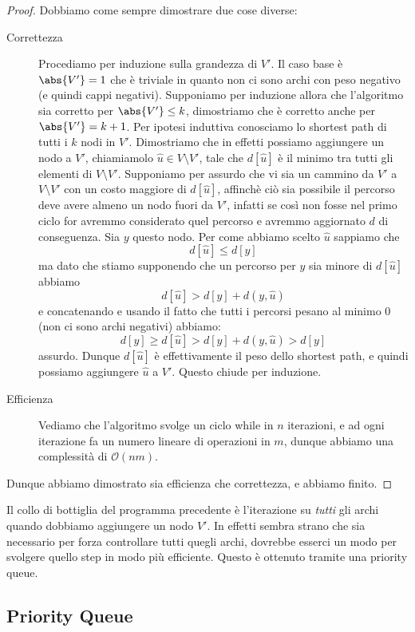 \documentclass[11pt]{scrartcl}
\newcommand{\bigo}{\mathcal{O}}
\begin{document}
	\begin{proof}
		Dobbiamo come sempre dimostrare due cose diverse:
		\begin{description}
			\item[Correttezza] Procediamo per induzione sulla grandezza di $V'$. Il caso base è $\abs{V'}=1$ che è triviale in quanto non ci sono archi con peso negativo (e quindi cappi negativi). Supponiamo per induzione allora che l'algoritmo sia corretto per $\abs{V'}\le k$, dimostriamo che è corretto anche per $\abs{V'}=k+1$. Per ipotesi induttiva conosciamo lo shortest path di tutti i $k$ nodi in $V'$. Dimostriamo che in effetti possiamo aggiungere un nodo a $V'$, chiamiamolo $\hat{u}\in V\setminus V'$, tale che $d[\hat{u}]$ è il minimo tra tutti gli elementi di $V\setminus V'$. Supponiamo per assurdo che vi sia un cammino da $V'$ a $V\setminus V'$ con un costo maggiore di $d[\hat{u}]$, affinchè ciò sia possibile il percorso deve avere almeno un nodo fuori da $V'$, infatti se così non fosse nel primo ciclo for avremmo considerato quel percorso e avremmo aggiornato $d$ di conseguenza. Sia $y$ questo nodo. Per come abbiamo scelto $\hat{u}$ sappiamo che
			$$d[\hat{u}]\le d[y]$$
			ma dato che stiamo supponendo che un percorso per $y$ sia minore di $d[\hat{u}]$ abbiamo
			$$d[\hat{u}]>d[y]+d(y,\hat{u})$$
			e concatenando e usando il fatto che tutti i percorsi pesano al minimo $0$ (non ci sono archi negativi) abbiamo:
			$$d[y]\ge d[\hat{u}] > d[y]+d(y,\hat{u})>d[y]$$
			assurdo. Dunque $d[\hat{u}]$ è effettivamente il peso dello shortest path, e quindi possiamo aggiungere $\hat{u}$ a $V'$. Questo chiude per induzione.
			\item[Efficienza] Vediamo che l'algoritmo svolge un ciclo while in $n$ iterazioni, e ad ogni iterazione fa un numero lineare di operazioni in $m$, dunque abbiamo una complessità di $\bigo(nm)$.
		\end{description}
		Dunque abbiamo dimostrato sia efficienza che correttezza, e abbiamo finito.
	\end{proof}
	
	Il collo di bottiglia del programma precedente è l'iterazione su \textit{tutti} gli archi quando dobbiamo aggiungere un nodo $V'$. In effetti sembra strano che sia necessario per forza controllare tutti quegli archi, dovrebbe esserci un modo per svolgere quello step in modo più efficiente. Questo è ottenuto tramite una priority queue.
	
	\subsection{Priority Queue}
	
\end{document}

